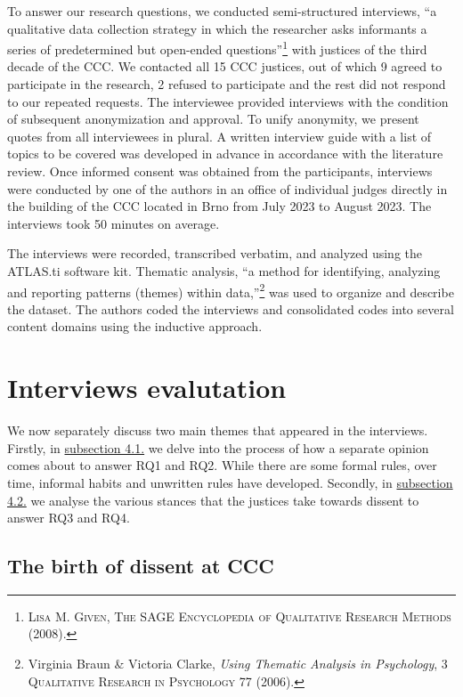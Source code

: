 \documentclass[
  11pt,
]{article}
\begin{document}
To answer our research questions, we conducted semi-structured interviews, ``a qualitative data collection strategy in which the researcher asks informants a series of predetermined but open-ended questions''\footnote{\textsc{Lisa M. Given}, \textsc{The {SAGE Encyclopedia} of {Qualitative Research Methods}} (2008).} with justices of the third decade of the CCC.
We contacted all 15 CCC justices, out of which 9 agreed to participate in the research, 2 refused to participate and the rest did not respond to our repeated requests. The interviewee provided interviews with the condition of subsequent anonymization and approval. To unify anonymity, we present quotes from all interviewees in plural.
A written interview guide with a list of topics to be covered was developed in advance in accordance with the literature review. Once informed consent was obtained from the participants, interviews were conducted by one of the authors in an office of individual judges directly in the building of the CCC located in Brno from July 2023 to August 2023. The interviews took 50 minutes on average.

The interviews were recorded, transcribed verbatim, and analyzed using the ATLAS.ti software kit. Thematic analysis, ``a method for identifying, analyzing and reporting patterns (themes) within data,''\footnote{Virginia Braun \& Victoria Clarke, \emph{Using Thematic Analysis in Psychology}, 3 \textsc{Qualitative Research in Psychology} 77 (2006).} was used to organize and describe the dataset. The authors coded the interviews and consolidated codes into several content domains using the inductive approach.

\section{Interviews evalutation}\label{empirics}

We now separately discuss two main themes that appeared in the interviews. Firstly, in \hyperref[birth]{subsection 4.1.} we delve into the process of how a separate opinion comes about to answer RQ1 and RQ2. While there are some formal rules, over time, informal habits and unwritten rules have developed. Secondly, in \hyperref[stances]{subsection 4.2.} we analyse the various stances that the justices take towards dissent to answer RQ3 and RQ4.

\subsection{The birth of dissent at CCC}\label{birth}
\end{document}

